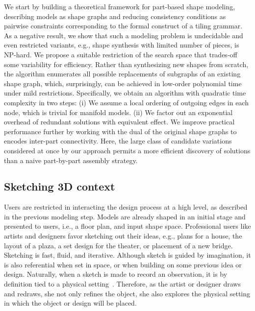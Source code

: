 We start by building a theoretical framework for part-based shape modeling, describing models as shape graphs and reducing consistency conditions as pairwise constraints corresponding to the formal construct of a tiling grammar. As a negative result, we show that such a modeling problem is undecidable and even restricted variants, e.g., shape synthesis with limited number of pieces, is NP-hard. We propose a suitable restriction of the search space that trades-off some variability for efficiency. Rather than synthesizing new shapes from scratch, the algorithm enumerates all possible replacements of subgraphs of an existing shape graph, which, surprisingly, can be achieved in low-order polynomial time under mild restrictions. Specifically, we obtain an algorithm with quadratic time complexity in two steps: (i) We assume a local ordering of outgoing edges in each node, which is trivial for manifold models. (ii) We factor out an exponential overhead of redundant solutions with equivalent effect. We improve practical performance further by working with the dual of the original shape graphs to encodes inter-part connectivity. Here, the large class of candidate variations considered at once by our approach permits a more efficient discovery of solutions than a naive part-by-part assembly strategy.

\subsection{Sketching 3D context}

Users are restricted in interacting the design process at a high level, as described in the previous modeling step. Models are already shaped in an initial stage and presented to users, i.e., a floor plan, and input shape space. Professional users like artists and designers favor sketching out their ideas, e.g., plans for a house, the layout of a plaza, a set design for the theater, or placement of a new bridge. Sketching is fast, fluid, and iterative. Although sketch is guided by imagination, it is also referential when set in space, or when building on some previous idea or design. Naturally, when a sketch is made to record an observation, it is by definition tied to a physical setting~\cite{NecessityDrawing77}. Therefore, as the artist or designer draws and redraws, she not only refines the object, she also explores the physical setting in which the object or design will be placed.

